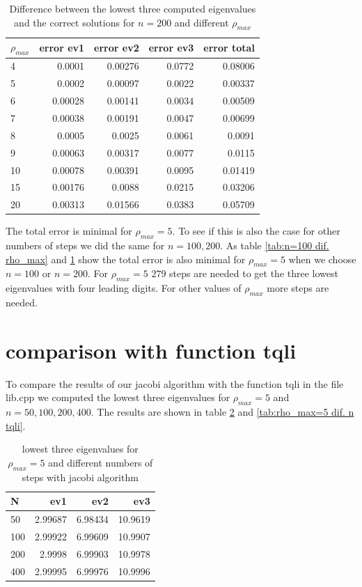 \documentclass[11pt,a4wide]{article}
\begin{document}
\begin{table}%
\centering
\caption{Difference between the lowest three computed eigenvalues and the correct solutions for $n=200$ and different $\rho_{max}$}
\begin{tabular}{lrrrr}\hline
$\rho_{max}$ & error ev1 & error ev2 & error ev3 & error total\\\hline
4 &	0.0001	& 0.00276	& 0.0772	& 0.08006\\
5	& 0.0002	& 0.00097	& 0.0022	& 0.00337\\
6	& 0.00028	& 0.00141	& 0.0034	& 0.00509\\
7	& 0.00038	& 0.00191	& 0.0047	& 0.00699\\
8	& 0.0005	& 0.0025	& 0.0061	& 0.0091\\
9	& 0.00063	& 0.00317	& 0.0077	& 0.0115\\
10	& 0.00078	& 0.00391	& 0.0095	& 0.01419\\
15	& 0.00176	& 0.0088	& 0.0215	& 0.03206\\
20	& 0.00313	& 0.01566	& 0.0383	& 0.05709\\\hline
\end{tabular}
\label{tab:n=200 dif. rho_max}
\end{table}

The total error is minimal for $\rho_{max}=5$. To see if this is also the case for other numbers of steps we did the same for $n= 100,200$. As table \ref{tab:n=100 dif. rho_max} and \ref{tab:n=200 dif. rho_max} show the total error is also minimal for $\rho_{max}=5$ when we choose $n=100$ or $n=200$. For $\rho_{max}=5$ $279$ steps are needed to get the three lowest eigenvalues with four leading digits. For other values of $\rho_{max}$ more steps are needed. 

\section{comparison with function tqli}
To compare the results of our jacobi algorithm with the function tqli in the file lib.cpp we computed the lowest three eigenvalues for $\rho_{max}=5$ and $n=50,100,200,400$. The results are shown in table \ref{tab:rho_max=5 dif. n jacobi} and \ref{tab:rho_max=5 dif. n tqli}.

\begin{table}%
\centering
\caption{lowest three eigenvalues for $\rho_{max}=5$ and different numbers of steps with jacobi algorithm}
\begin{tabular}{lrrr}\hline
N & ev1 & ev2 & ev3\\\hline
50 &	2.99687	& 6.98434	& 10.9619\\ 
100	& 2.99922	& 6.99609	& 10.9907\\ 
200	& 2.9998	& 6.99903	& 10.9978\\ 
400	& 2.99995	& 6.99976	& 10.9996\\\hline
\end{tabular}
\label{tab:rho_max=5 dif. n jacobi}
\end{table}
\end{document}

